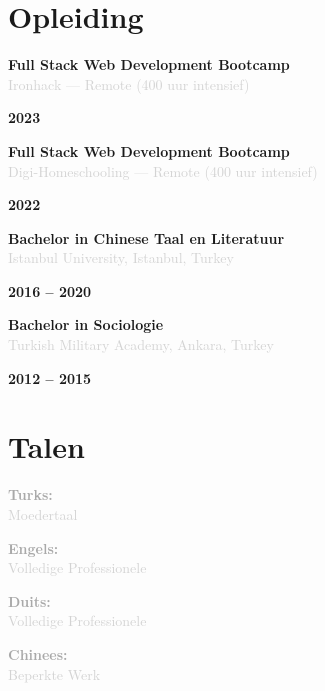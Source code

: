 \documentclass[10pt,a4paper]{article}
\newcommand{\Education}[3]{%
  \vspace{2pt}
  \noindent
  \begin{minipage}[t]{0.70\textwidth}
    {\normalsize\textbf{\color{darkgray}#1}} \\
    \textcolor{lightgray}{\small #2}
  \end{minipage}%
  \hfill
  \begin{minipage}[t]{0.28\textwidth}
    \raggedleft
    \textcolor{mediumgray}{\small\textbf{#3}}
  \end{minipage}
  \vspace{1pt}
}
\begin{document}
\section*{Opleiding}

\Education{Full Stack Web Development Bootcamp}{Ironhack — Remote (400 uur intensief)}{2023}

\Education{Full Stack Web Development Bootcamp}{Digi-Homeschooling — Remote (400 uur intensief)}{2022}

\Education{Bachelor in Chinese Taal en Literatuur}{Istanbul University, Istanbul, Turkey}{2016 -- 2020}

\Education{Bachelor in Sociologie}{Turkish Military Academy, Ankara, Turkey}{2012 -- 2015}

\section*{Talen}

\vspace{1pt}
\noindent
\begin{minipage}[t]{0.24\textwidth}
  \textcolor{darkgray}{\textbf{Turks:}} \\
  \textcolor{lightgray}{\small Moedertaal}
\end{minipage}%
\hfill
\begin{minipage}[t]{0.24\textwidth}
  \textcolor{darkgray}{\textbf{Engels:}} \\
  \textcolor{lightgray}{\small Volledige Professionele}
\end{minipage}%
\hfill
\begin{minipage}[t]{0.24\textwidth}
  \textcolor{darkgray}{\textbf{Duits:}} \\
  \textcolor{lightgray}{\small Volledige Professionele}
\end{minipage}%
\hfill
\begin{minipage}[t]{0.24\textwidth}
  \textcolor{darkgray}{\textbf{Chinees:}} \\
  \textcolor{lightgray}{\small Beperkte Werk}
\end{minipage}
\end{document}
